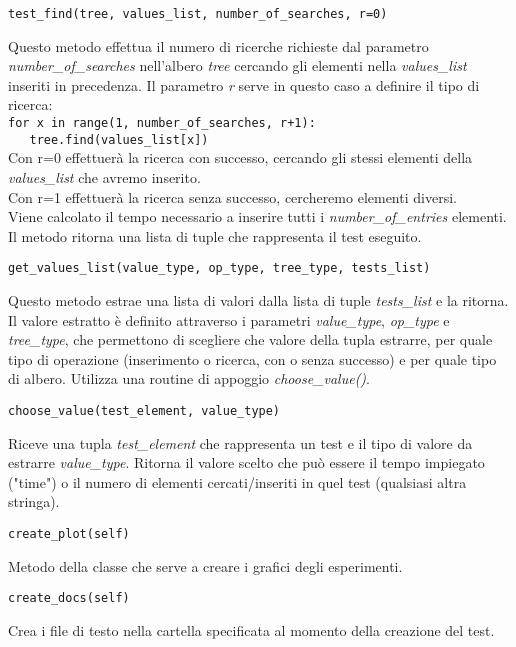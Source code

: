 \documentclass{article}
\begin{document}
\begin{verbatim}test_find(tree, values_list, number_of_searches, r=0)\end{verbatim}
Questo metodo effettua il numero di ricerche richieste dal parametro \emph{number\_of\_searches} nell'albero \emph{tree} cercando gli elementi nella \emph{values\_list} inseriti in precedenza. Il parametro \emph{r} serve in questo caso a definire il tipo di ricerca: \\
\verb|for x in range(1, number_of_searches, r+1):|\\
\verb|   tree.find(values_list[x])|\\
Con r=0 effettuerà la ricerca con successo, cercando gli stessi elementi della \emph{values\_list} che avremo inserito. \\
Con r=1 effettuerà la ricerca senza successo, cercheremo elementi diversi.\\
Viene calcolato il tempo necessario a inserire tutti i \emph{number\_of\_entries} elementi. Il metodo ritorna una lista di tuple che rappresenta il test eseguito.
\begin{verbatim}get_values_list(value_type, op_type, tree_type, tests_list)\end{verbatim}
Questo metodo estrae una lista di valori dalla lista di tuple \emph{tests\_list} e la ritorna. Il valore estratto è definito attraverso i parametri \emph{value\_type}, \emph{op\_type} e \emph{tree\_type}, che permettono di scegliere che valore della tupla estrarre, per quale tipo di operazione (inserimento o ricerca, con o senza successo) e per quale tipo di albero. Utilizza una routine di appoggio \emph{choose\_value()}.
\begin{verbatim}choose_value(test_element, value_type)\end{verbatim}
Riceve una tupla \emph{test\_element} che rappresenta un test e il tipo di valore da estrarre \emph{value\_type}. Ritorna il valore scelto che può essere il tempo impiegato ("time") o il numero di elementi cercati/inseriti in quel test (qualsiasi altra stringa). 
\begin{verbatim}create_plot(self)\end{verbatim}
Metodo della classe che serve a creare i grafici degli esperimenti.
\begin{verbatim}create_docs(self)\end{verbatim}
Crea i file di testo nella cartella specificata al momento della creazione del test.
\end{document}
